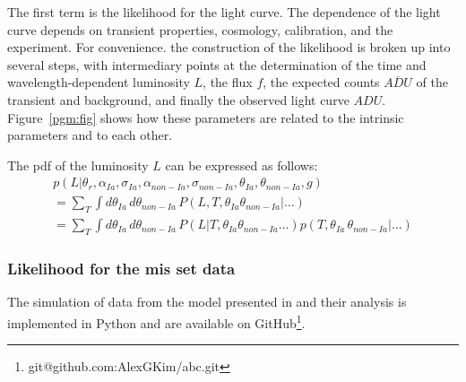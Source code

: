 \documentclass[preprint,3p]{elsarticle}
\begin{document}
The first term is the likelihood for the light curve.  The dependence of the light curve depends
on transient properties, cosmology, calibration, and the experiment.  For convenience. the
construction of the likelihood is broken up into several steps, with intermediary points
at the determination of the time and wavelength-dependent luminosity $L$,
the flux $f$, the expected counts $\overline{\mathit{ADU}}$ of the transient and background, and
finally the observed light curve $\mathit{ADU}$.  Figure~\ref{pgm:fig} shows how these
parameters are related to the intrinsic parameters and to each other.

The pdf of the luminosity $L$ can be expressed as follows:
\begin{multline}
p(L|  \theta_r,\alpha_{Ia},\sigma_{Ia}, \alpha_{\mathit{non-Ia}},\sigma_{\mathit{non-Ia}}, \theta_{Ia}, \theta_{non-Ia}, g)  \\
= \sum_T \int d\theta_{Ia}\, d\theta_{non-Ia}\, P(L, T, \theta_{Ia} \theta_{non-Ia}|\ldots) \\
= \sum_T \int d\theta_{Ia}\, d\theta_{non-Ia}\, P(L| T, \theta_{Ia} \theta_{non-Ia} \ldots) p(T,
\theta_{Ia}\, \theta_{non-Ia} | \ldots)
\end{multline}


\subsubsection{Likelihood for the mis set data}



The simulation of data from the model presented in
and their analysis is implemented in Python and are available
on GitHub\footnote{{git@github.com:AlexGKim/abc.git}}.

 

\end{document}
